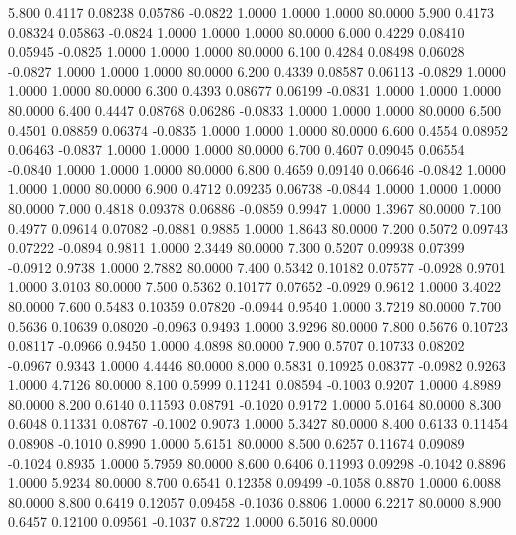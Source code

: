    5.800   0.4117   0.08238   0.05786  -0.0822   1.0000   1.0000   1.0000  80.0000
   5.900   0.4173   0.08324   0.05863  -0.0824   1.0000   1.0000   1.0000  80.0000
   6.000   0.4229   0.08410   0.05945  -0.0825   1.0000   1.0000   1.0000  80.0000
   6.100   0.4284   0.08498   0.06028  -0.0827   1.0000   1.0000   1.0000  80.0000
   6.200   0.4339   0.08587   0.06113  -0.0829   1.0000   1.0000   1.0000  80.0000
   6.300   0.4393   0.08677   0.06199  -0.0831   1.0000   1.0000   1.0000  80.0000
   6.400   0.4447   0.08768   0.06286  -0.0833   1.0000   1.0000   1.0000  80.0000
   6.500   0.4501   0.08859   0.06374  -0.0835   1.0000   1.0000   1.0000  80.0000
   6.600   0.4554   0.08952   0.06463  -0.0837   1.0000   1.0000   1.0000  80.0000
   6.700   0.4607   0.09045   0.06554  -0.0840   1.0000   1.0000   1.0000  80.0000
   6.800   0.4659   0.09140   0.06646  -0.0842   1.0000   1.0000   1.0000  80.0000
   6.900   0.4712   0.09235   0.06738  -0.0844   1.0000   1.0000   1.0000  80.0000
   7.000   0.4818   0.09378   0.06886  -0.0859   0.9947   1.0000   1.3967  80.0000
   7.100   0.4977   0.09614   0.07082  -0.0881   0.9885   1.0000   1.8643  80.0000
   7.200   0.5072   0.09743   0.07222  -0.0894   0.9811   1.0000   2.3449  80.0000
   7.300   0.5207   0.09938   0.07399  -0.0912   0.9738   1.0000   2.7882  80.0000
   7.400   0.5342   0.10182   0.07577  -0.0928   0.9701   1.0000   3.0103  80.0000
   7.500   0.5362   0.10177   0.07652  -0.0929   0.9612   1.0000   3.4022  80.0000
   7.600   0.5483   0.10359   0.07820  -0.0944   0.9540   1.0000   3.7219  80.0000
   7.700   0.5636   0.10639   0.08020  -0.0963   0.9493   1.0000   3.9296  80.0000
   7.800   0.5676   0.10723   0.08117  -0.0966   0.9450   1.0000   4.0898  80.0000
   7.900   0.5707   0.10733   0.08202  -0.0967   0.9343   1.0000   4.4446  80.0000
   8.000   0.5831   0.10925   0.08377  -0.0982   0.9263   1.0000   4.7126  80.0000
   8.100   0.5999   0.11241   0.08594  -0.1003   0.9207   1.0000   4.8989  80.0000
   8.200   0.6140   0.11593   0.08791  -0.1020   0.9172   1.0000   5.0164  80.0000
   8.300   0.6048   0.11331   0.08767  -0.1002   0.9073   1.0000   5.3427  80.0000
   8.400   0.6133   0.11454   0.08908  -0.1010   0.8990   1.0000   5.6151  80.0000
   8.500   0.6257   0.11674   0.09089  -0.1024   0.8935   1.0000   5.7959  80.0000
   8.600   0.6406   0.11993   0.09298  -0.1042   0.8896   1.0000   5.9234  80.0000
   8.700   0.6541   0.12358   0.09499  -0.1058   0.8870   1.0000   6.0088  80.0000
   8.800   0.6419   0.12057   0.09458  -0.1036   0.8806   1.0000   6.2217  80.0000
   8.900   0.6457   0.12100   0.09561  -0.1037   0.8722   1.0000   6.5016  80.0000
